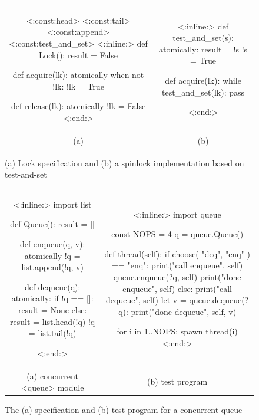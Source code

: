 \documentclass[twocolumn]{article}
\begin{document}
\begin{figure}[h]
\begin{center}
\begin{tabular}{cc}
{\footnotesize
\begin{tcolorbox}[width=0.45\linewidth]
<{:const:head}>
<{:const:tail}>
<{:const:append}>
<{:const:test_and_set}>
<{:inline:}>
def Lock():
    result = False

def acquire(lk):
    atomically when not !lk:
        !lk = True

def release(lk):
    atomically !lk = False
<{:end:}>
\end{tcolorbox}
}
&
{\footnotesize
\begin{tcolorbox}[width=0.45\linewidth]
<{:inline:}>
def test_and_set(s):
    atomically:
        result = !s
        !s = True

def acquire(lk):
    while test_and_set(lk):
        pass

<{:end:}>
\end{tcolorbox}
}
\\
(a) & (b)
\end{tabular}
\end{center}
\caption{(a) Lock specification and (b) a spinlock implementation based on
test-and-set}
\label{fig:synch}
\end{figure}

\begin{figure}[h]
\begin{center}
\begin{tabular}{cc}
{\footnotesize
\begin{tcolorbox}[width=0.45\linewidth]
<{:inline:}>
import list

def Queue():
    result = []

def enqueue(q, v):
    atomically !q = list.append(!q, v)

def dequeue(q):
    atomically:
        if !q == []:
            result = None
        else:
            result = list.head(!q)
            !q = list.tail(!q)

<{:end:}>
\end{tcolorbox}
}
&
{\footnotesize
\begin{tcolorbox}[width=0.48\linewidth]
<{:inline:}>
import queue

const NOPS = 4
q = queue.Queue()

def thread(self):
    if choose({ "deq", "enq" }) == "enq":
        print("call enqueue", self)
        queue.enqueue(?q, self)
        print("done enqueue", self)
    else:
        print("call dequeue", self)
        let v = queue.dequeue(?q):
            print("done dequeue", self, v)

for i in {1..NOPS}: spawn thread(i)
<{:end:}>
\end{tcolorbox}
}
\\
(a) concurrent <{queue}> module & (b) test program
\end{tabular}
\end{center}
\caption{The (a) specification and (b) test program for a concurrent queue}
\label{fig:queue}
\end{figure}
\end{document}
